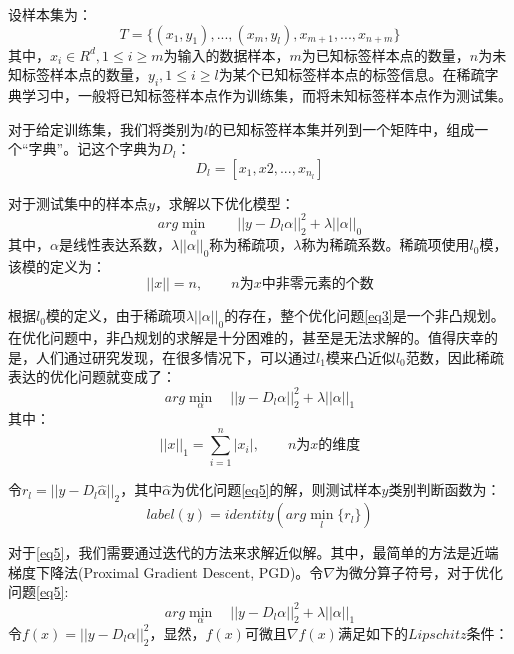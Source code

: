 \documentclass[12pt,a4paper]{article}
\begin{document}
设样本集为：
\begin{equation}\label{eq1}
T = \{(x_1, y_1), ... , (x_m, y_l), x_{m + 1}, ... , x_{n + m}\}
\end{equation}
其中，$x_i \in R^d, 1 \leq i \geq m $为输入的数据样本，$m$为已知标签样本点的数量，$n$为未知标签样本点的数量，$y_i, 1 \leq i \geq l$为某个已知标签样本点的标签信息。在稀疏字典学习中，一般将已知标签样本点作为训练集，而将未知标签样本点作为测试集。

对于给定训练集，我们将类别为$l$的已知标签样本集并列到一个矩阵中，组成一个“字典”。记这个字典为$D_{l}$：
\begin{equation}\label{eq2}
D_{l} = [x_1, x2, ... , x_{n_{l}}]
\end{equation}

对于测试集中的样本点$y$，求解以下优化模型：
\begin{equation}\label{eq3}
arg\min_{\alpha} \qquad ||y - D_{l}\alpha||_{2}^{2} + \lambda||\alpha||_{0}
\end{equation}
其中，$\alpha$是线性表达系数，$\lambda||\alpha||_{0}$称为稀疏项，$\lambda$称为稀疏系数。稀疏项使用$l_0$模，该模的定义为：
\begin{equation}\label{eq4}
||x|| = n, \qquad n为x中非零元素的个数
\end{equation}

根据$l_{0}$模的定义，由于稀疏项$\lambda||\alpha||_{0}$的存在，整个优化问题\eqref{eq3}是一个非凸规划。在优化问题中，非凸规划的求解是十分困难的，甚至是无法求解的。值得庆幸的是，人们通过研究发现，在很多情况下，可以通过$l_{1}$模来凸近似$l_{0}$范数，因此稀疏表达的优化问题就变成了：
\begin{equation}
\label{eq5}
arg\min_{\alpha} \quad ||y - D_{l}\alpha||_{2}^{2} + \lambda||\alpha||_{1}
\end{equation}
其中：
\begin{equation}
\label{eq6}
||x||_{1} = \sum_{i = 1}^{n} |x_{i}|, \qquad n为x的维度
\end{equation}

令$r_{l} = ||y - D_{l}\hat{\alpha}||_{2}$，其中$\hat{\alpha}$为优化问题\eqref{eq5}的解，则测试样本$y$类别判断函数为：
\begin{equation*}
label(y) = identity(arg\min_{l}\{r_{l}\})
\end{equation*}

对于\eqref{eq5}，我们需要通过迭代的方法来求解近似解。其中，最简单的方法是近端梯度下降法(Proximal Gradient Descent, PGD)。令$\nabla$为微分算子符号，对于优化问题\eqref{eq5}:
$$arg\min_{\alpha} \quad ||y - D_{l}\alpha||_{2}^{2} + \lambda||\alpha||_{1}$$
令$f(x) = ||y - D_{l}\alpha||_{2}^{2}$，显然，$f(x)$可微且$\nabla f(x)$满足如下的$Lipschitz$条件：
\end{document}

